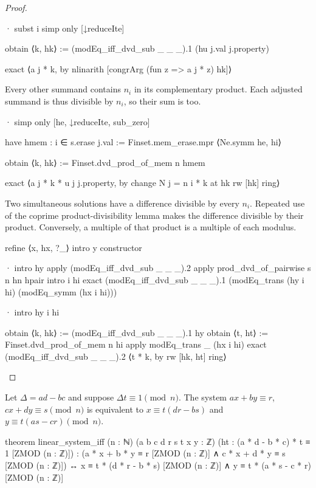 \begin{proof}
\begin{lean}
    · subst i
      simp only [↓reduceIte]

      obtain ⟨k, hk⟩ := (modEq_iff_dvd_sub _ _ _).1 (hu j.val j.property)

      exact ⟨a j * k, by nlinarith [congrArg (fun z => a j * z) hk]⟩
  \end{lean}

  Every other summand contains $n_i$ in its complementary product.
  Each adjusted summand is thus divisible by $n_i$, so their sum is too.

  \begin{lean}
    · simp only [he, ↓reduceIte, sub_zero]

      have hmem : i ∈ s.erase j.val := Finset.mem_erase.mpr ⟨Ne.symm he, hi⟩

      obtain ⟨k, hk⟩ := Finset.dvd_prod_of_mem n hmem

      exact ⟨a j * k * u j j.property, by
          change N j = n i * k at hk
          rw [hk]
          ring⟩
  \end{lean}

  Two simultaneous solutions have a difference divisible by every $n_i$.
  Repeated use of the coprime product-divisibility lemma makes the difference divisible by their
  product.
  Conversely, a multiple of that product is a multiple of each modulus.

  \begin{lean}
    refine ⟨x, hx, ?_⟩
    intro y
    constructor

    · intro hy
      apply (modEq_iff_dvd_sub _ _ _).2
      apply prod_dvd_of_pairwise s n hn hpair
      intro i hi
      exact (modEq_iff_dvd_sub _ _ _).1 (modEq_trans (hy i hi) (modEq_symm (hx i hi)))

    · intro hy i hi

      obtain ⟨k, hk⟩ := (modEq_iff_dvd_sub _ _ _).1 hy
      obtain ⟨t, ht⟩ := Finset.dvd_prod_of_mem n hi
      apply modEq_trans _ (hx i hi)
      exact (modEq_iff_dvd_sub _ _ _).2 ⟨t * k, by
          rw [hk, ht]
          ring⟩
  \end{lean}
\end{proof}

\begin{theorem}
  \label{ent:thm:linear-system-iff}
  Let $\Delta=ad-bc$ and suppose $\Delta t\equiv1\pmod n$.
  The system $ax+by\equiv r$, $cx+dy\equiv s\pmod n$ is equivalent to $x\equiv t(dr-bs)$ and
  $y\equiv t(as-cr)\pmod n$.

  \begin{lean}
    theorem linear_system_iff (n : ℕ) (a b c d r s t x y : ℤ)
        (ht : (a * d - b * c) * t ≡ 1 [ZMOD (n : ℤ)]) :
        (a * x + b * y ≡ r [ZMOD (n : ℤ)] ∧ c * x + d * y ≡ s [ZMOD (n : ℤ)]) ↔
          x ≡ t * (d * r - b * s) [ZMOD (n : ℤ)] ∧
          y ≡ t * (a * s - c * r) [ZMOD (n : ℤ)]
  \end{lean}
\end{theorem}

